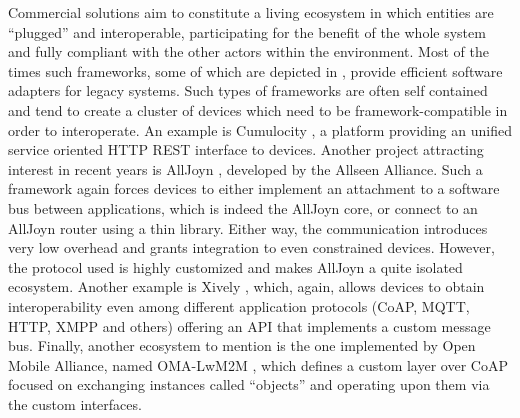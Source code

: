 Commercial solutions aim to constitute a living ecosystem in which entities are ``plugged'' and interoperable, participating for the benefit of the whole system and fully compliant with the other actors within the environment.
Most of the times such frameworks, some of which are depicted in \cite{derhamy2015survey}, provide efficient software adapters for legacy systems.
Such types of frameworks are often self contained and tend to create a cluster of devices which need to be framework-compatible in order to interoperate.
An example is Cumulocity \cite{cumulocity}, a platform providing an unified service oriented HTTP REST interface to devices.
Another project attracting interest in recent years is AllJoyn \cite{alljoyn}, developed by the Allseen Alliance.
Such a framework again forces devices to either implement an attachment to a software bus between applications, which is indeed the AllJoyn core, or connect to an AllJoyn router using a thin library.
Either way, the communication introduces very low overhead and grants integration to even constrained devices.
However, the protocol used is highly customized and makes AllJoyn a quite isolated ecosystem.
Another example is Xively \cite{xively}, which, again, allows devices to obtain interoperability even among different application protocols (CoAP, MQTT, HTTP, XMPP and others) offering an API that implements a custom message bus.
Finally, another ecosystem to mention is the one implemented by Open Mobile Alliance, named OMA-LwM2M \cite{omalwm2m}, which defines a custom layer over CoAP focused on exchanging instances called ``objects'' and operating upon them via the custom interfaces.